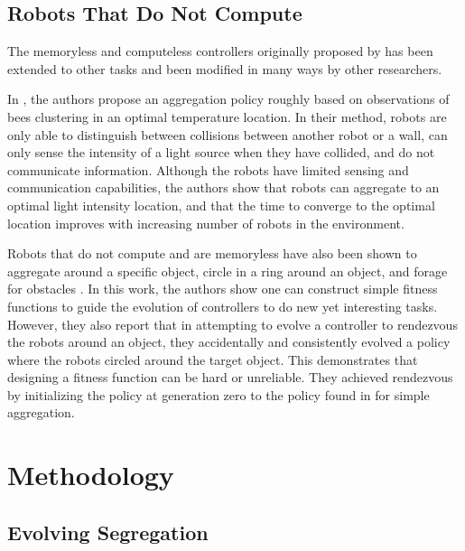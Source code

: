 \documentclass[conference]{IEEEtran}
\begin{document}
  \subsection{Robots That Do Not Compute}

    The memoryless and computeless controllers originally proposed by \cite{gauci_self-organized_2014} has been extended to other tasks and been modified in many ways by other researchers.

    In \cite{kernbach_re-embodiment_2009}, the authors propose an aggregation policy roughly based on observations of bees clustering in an optimal temperature location. In their method, robots are only able to distinguish between collisions between another robot or a wall, can only sense the intensity of a light source when they have collided, and do not communicate information. Although the robots have limited sensing and communication capabilities, the authors show that robots can aggregate to an optimal light intensity location, and that the time to converge to the optimal location improves with increasing number of robots in the environment.

    Robots that do not compute and are memoryless have also been shown to aggregate around a specific object, circle in a ring around an object, and forage for obstacles \cite{johnson_evolving_2016}. In this work, the authors show one can construct simple fitness functions to guide the evolution of controllers to do new yet interesting tasks. However, they also report that in attempting to evolve a controller to rendezvous the robots around an object, they accidentally and consistently evolved a policy where the robots circled around the target object. This demonstrates that designing a fitness function can be hard or unreliable. They achieved rendezvous by initializing the policy at generation zero to the policy found in \cite{gauci_self-organized_2014} for simple aggregation.

\section{Methodology}

  \subsection{Evolving Segregation}
\end{document}
